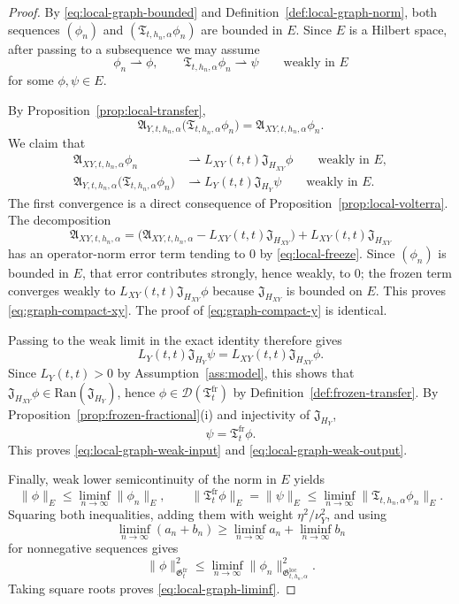 \documentclass[11pt,a4paper]{amsart}
\theoremstyle{plain}
\theoremstyle{definition}
\theoremstyle{remark}
\begin{document}
\begin{proof}
By \eqref{eq:local-graph-bounded} and Definition~\ref{def:local-graph-norm}, both sequences
\((\phi_n)\) and \((\mathfrak T_{t,h_n,\alpha}\phi_n)\) are bounded in \(E\). Since \(E\) is a
Hilbert space, after passing to a subsequence we may assume
\[
\phi_n\rightharpoonup \phi,
\qquad
\mathfrak T_{t,h_n,\alpha}\phi_n\rightharpoonup \psi
\qquad\text{weakly in }E
\]
for some \(\phi,\psi\in E\).

By Proposition~\ref{prop:local-transfer},
\[
\mathfrak A_{Y,t,h_n,\alpha}\bigl(\mathfrak T_{t,h_n,\alpha}\phi_n\bigr)
=
\mathfrak A_{XY,t,h_n,\alpha}\phi_n.
\]
We claim that
\begin{align}
\mathfrak A_{XY,t,h_n,\alpha}\phi_n
&\rightharpoonup
L_{XY}(t,t)\mathfrak J_{H_{XY}}\phi
\qquad\text{weakly in }E, \label{eq:graph-compact-xy}\\
\mathfrak A_{Y,t,h_n,\alpha}\bigl(\mathfrak T_{t,h_n,\alpha}\phi_n\bigr)
&\rightharpoonup
L_Y(t,t)\mathfrak J_{H_Y}\psi
\qquad\text{weakly in }E. \label{eq:graph-compact-y}
\end{align}
The first convergence is a direct consequence of Proposition~\ref{prop:local-volterra}.  The
decomposition
\[
\mathfrak A_{XY,t,h_n,\alpha}
=
\bigl(\mathfrak A_{XY,t,h_n,\alpha}-L_{XY}(t,t)\mathfrak J_{H_{XY}}\bigr)
+L_{XY}(t,t)\mathfrak J_{H_{XY}}
\]
has an operator-norm error term tending to \(0\) by \eqref{eq:local-freeze}. Since
\((\phi_n)\) is bounded in \(E\), that error contributes strongly, hence weakly, to
\(0\); the frozen term converges weakly to \(L_{XY}(t,t)\mathfrak J_{H_{XY}}\phi\)
because \(\mathfrak J_{H_{XY}}\) is bounded on \(E\). This proves
\eqref{eq:graph-compact-xy}. The proof of \eqref{eq:graph-compact-y} is identical.

Passing to the weak limit in the exact identity therefore gives
\[
L_Y(t,t)\mathfrak J_{H_Y}\psi
=
L_{XY}(t,t)\mathfrak J_{H_{XY}}\phi.
\]
Since \(L_Y(t,t)>0\) by Assumption~\ref{ass:model}, this shows that
\(\mathfrak J_{H_{XY}}\phi\in\mathrm{Ran}(\mathfrak J_{H_Y})\), hence
\(\phi\in\mathcal D(\mathfrak T_t^{\mathrm{fr}})\) by Definition~\ref{def:frozen-transfer}. By
Proposition~\ref{prop:frozen-fractional}(i) and injectivity of \(\mathfrak J_{H_Y}\),
\[
\psi=\mathfrak T_t^{\mathrm{fr}}\phi.
\]
This proves \eqref{eq:local-graph-weak-input} and \eqref{eq:local-graph-weak-output}.

Finally, weak lower semicontinuity of the norm in \(E\) yields
\[
\|\phi\|_E\le \liminf_{n\to\infty}\|\phi_n\|_E,
\qquad
\|\mathfrak T_t^{\mathrm{fr}}\phi\|_E
=
\|\psi\|_E
\le
\liminf_{n\to\infty}\|\mathfrak T_{t,h_n,\alpha}\phi_n\|_E.
\]
Squaring both inequalities, adding them with weight \(\eta^2/\nu_Y^2\), and using
\[
\liminf_{n\to\infty}(a_n+b_n)\ge
\liminf_{n\to\infty}a_n+\liminf_{n\to\infty}b_n
\]
for nonnegative sequences gives
\[
\|\phi\|_{\mathfrak G_t^{\mathrm{fr}}}^2
\le
\liminf_{n\to\infty}\|\phi_n\|_{\mathfrak G_{t,h_n,\alpha}^{\mathrm{loc}}}^2.
\]
Taking square roots proves \eqref{eq:local-graph-liminf}.
\end{proof}
\end{document}
